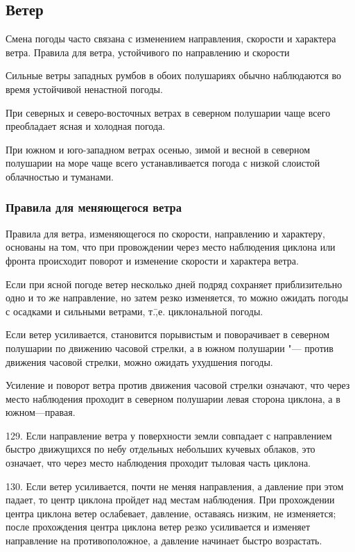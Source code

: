 \subsection{Ветер}

Смена погоды часто связана с изменением направления, скорости и
характера ветра.  Правила для ветра, устойчивого по направлению и
скорости

 Сильные ветры западных румбов в обоих полушариях обычно
наблюдаются во время устойчивой ненастной погоды.

 При северных и северо-восточных ветрах в северном полушарии
чаще всего преобладает ясная и холодная погода.

 При южном и юго-западном ветрах осенью, зимой и весной в северном
полушарии на море чаще всего устанавливается погода с низкой слоистой
облачностью и туманами.

\subsubsection{Правила для меняющегося ветра}

Правила для ветра, изменяющегося по скорости, направлению и характеру,
основаны на том, что при провождении через место наблюдения циклона
или фронта происходит поворот и изменение скорости и характера ветра.

 Если при ясной погоде ветер несколько дней подряд сохраняет
приблизительно одно и то же направление, но затем резко изменяется, то
можно ожидать погоды с осадками и сильными ветрами,
т.\=,е. циклональной погоды.

 Если ветер усиливается, становится порывистым и поворачивает в
северном полушарии по движению часовой стрелки, а в южном полушарии
"--- против движения часовой стрелки, можно ожидать ухудшения погоды.

 Усиление и поворот ветра против движения часовой стрелки
означают, что через место наблюдения проходит в северном полушарии
левая сторона циклона, а в южном—правая.

129. Если направление ветра у поверхности земли совпадает с направлением быстро движущихся по небу отдельных небольших кучевых облаков, это означает, что через место наблюдения проходит тыловая часть циклона.

130. Если ветер усиливается, почти не меняя направления, а давление при этом падает, то центр циклона пройдет над местам наблюдения. При прохождении центра циклона ветер ослабевает, давление, оставаясь низким, не изменяется; после прохождения центра циклона ветер резко усиливается и изменяет направление на противоположное, а давление начинает быстро возрастать.


